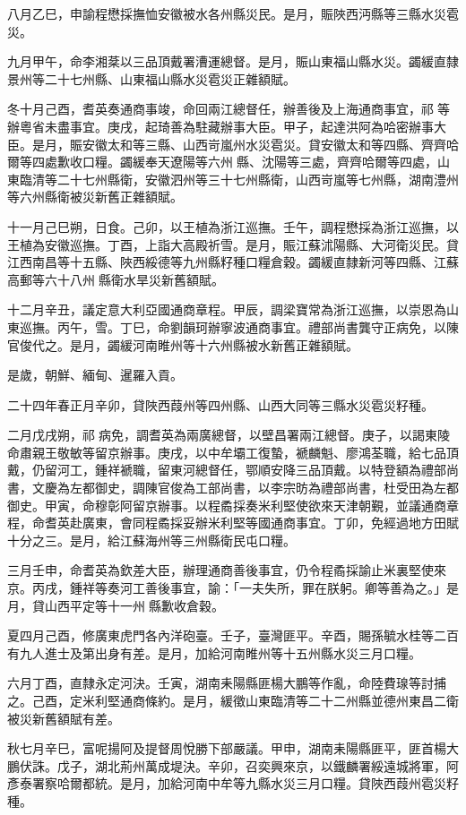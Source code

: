 \begin{pinyinscope}
八月乙巳，申諭程懋採撫恤安徽被水各州縣災民。是月，賑陜西沔縣等三縣水災雹災。

九月甲午，命李湘棻以三品頂戴署漕運總督。是月，賑山東福山縣水災。蠲緩直隸景州等二十七州縣、山東福山縣水災雹災正雜額賦。

冬十月己酉，耆英奏通商事竣，命回兩江總督任，辦善後及上海通商事宜，祁等辦粵省未盡事宜。庚戌，起琦善為駐藏辦事大臣。甲子，起達洪阿為哈密辦事大臣。是月，賑安徽太和等三縣、山西岢嵐州水災雹災。貸安徽太和等四縣、齊齊哈爾等四處歉收口糧。蠲緩奉天遼陽等六州縣、沈陽等三處，齊齊哈爾等四處，山東臨清等二十七州縣衛，安徽泗州等三十七州縣衛，山西岢嵐等七州縣，湖南澧州等六州縣衛被災新舊正雜額賦。

十一月己巳朔，日食。己卯，以王植為浙江巡撫。壬午，調程懋採為浙江巡撫，以王植為安徽巡撫。丁酉，上詣大高殿祈雪。是月，賑江蘇沭陽縣、大河衛災民。貸江西南昌等十五縣、陜西綏德等九州縣籽種口糧倉穀。蠲緩直隸新河等四縣、江蘇高郵等六十八州縣衛水旱災新舊額賦。

十二月辛丑，議定意大利亞國通商章程。甲辰，調梁寶常為浙江巡撫，以崇恩為山東巡撫。丙午，雪。丁巳，命劉韻珂辦寧波通商事宜。禮部尚書龔守正病免，以陳官俊代之。是月，蠲緩河南睢州等十六州縣被水新舊正雜額賦。

是歲，朝鮮、緬甸、暹羅入貢。

二十四年春正月辛卯，貸陜西葭州等四州縣、山西大同等三縣水災雹災籽種。

二月戊戌朔，祁病免，調耆英為兩廣總督，以壁昌署兩江總督。庚子，以謁東陵命肅親王敬敏等留京辦事。庚戌，以中牟壩工復蟄，褫麟魁、廖鴻荃職，給七品頂戴，仍留河工，鍾祥褫職，留東河總督任，鄂順安降三品頂戴。以特登額為禮部尚書，文慶為左都御史，調陳官俊為工部尚書，以李宗昉為禮部尚書，杜受田為左都御史。甲寅，命穆彰阿留京辦事。以程矞採奏米利堅使欲來天津朝覲，並議通商章程，命耆英赴廣東，會同程矞採妥辦米利堅等國通商事宜。丁卯，免經過地方田賦十分之三。是月，給江蘇海州等三州縣衛民屯口糧。

三月壬申，命耆英為欽差大臣，辦理通商善後事宜，仍令程矞採諭止米裏堅使來京。丙戌，鍾祥等奏河工善後事宜，諭：「一夫失所，罪在朕躬。卿等善為之。」是月，貸山西平定等十一州縣歉收倉穀。

夏四月己酉，修廣東虎門各內洋砲臺。壬子，臺灣匪平。辛酉，賜孫毓水桂等二百有九人進士及第出身有差。是月，加給河南睢州等十五州縣水災三月口糧。

六月丁酉，直隸永定河決。壬寅，湖南耒陽縣匪楊大鵬等作亂，命陸費瑔等討捕之。己酉，定米利堅通商條約。是月，緩徵山東臨清等二十二州縣並德州東昌二衛被災新舊額賦有差。

秋七月辛巳，富呢揚阿及提督周悅勝下部嚴議。甲申，湖南耒陽縣匪平，匪首楊大鵬伏誅。戊子，湖北荊州萬成堤決。辛卯，召奕興來京，以鐵麟署綏遠城將軍，阿彥泰署察哈爾都統。是月，加給河南中牟等九縣水災三月口糧。貸陜西葭州雹災籽種。


\end{pinyinscope}
